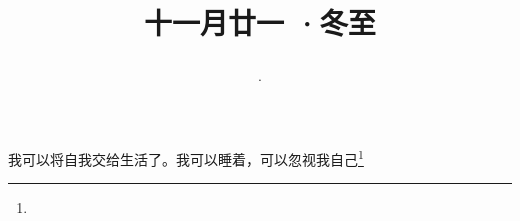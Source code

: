\title{\date[d=21,m=12,y=2024][year:cn-y,年,month:cn,day:cn,日,·,weekday]·十一月廿一 ·冬至}
我可以将自我交给生活了。我可以睡着，可以忽视我自己\footnote{ }

